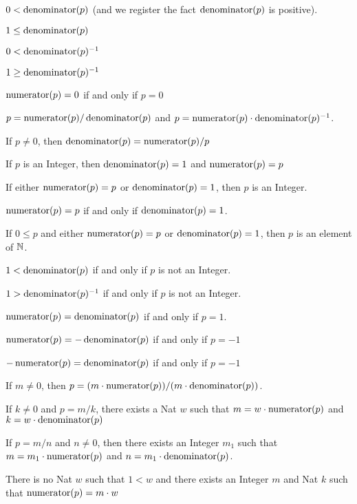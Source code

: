 \documentclass{article}
\begin{document}
\begin{thm}
\item\label{rat1:10} $0<\operatorname{denominator}(p)$ (and we register the fact
  $\operatorname{denominator}(p)$ is positive).
\item\label{rat1:11} $1\leq\operatorname{denominator}(p)$
\item\label{rat1:12} $0<\operatorname{denominator}(p)^{-1}$
\item\label{rat1:13} $1\geq\operatorname{denominator}(p)^{-1}$
\item\label{rat1:14} $\operatorname{numerator}(p)=0$ if and only if $p=0$
\item\label{rat1:15} $p=\operatorname{numerator}(p)/\operatorname{denominator}(p)$ and $p=\operatorname{numerator}(p)\cdot\operatorname{denominator}(p)^{-1}$.
\item\label{rat1:16} If $p\neq0$, then $\operatorname{denominator}(p)=\operatorname{numerator}(p)/p$
\item\label{rat1:17} If $p$ is an Integer, then $\operatorname{denominator}(p)=1$ and $\operatorname{numerator}(p)=p$
\item\label{rat1:18} If either $\operatorname{numerator}(p)=p$ or $\operatorname{denominator}(p)=1$,
  then $p$ is an Integer.
\item\label{rat1:19} $\operatorname{numerator}(p)=p$ if and only if $\operatorname{denominator}(p)=1$.
\item\label{rat1:20} If $0\leq p$ and either $\operatorname{numerator}(p)=p$ or
  $\operatorname{denominator}(p)=1$, then $p$ is an element of $\mathbb{N}$.
\item\label{rat1:21} $1<\operatorname{denominator}(p)$ if and only if $p$ is not an Integer.
\item\label{rat1:22} $1>\operatorname{denominator}(p)^{-1}$ if and only if $p$ is not
  an Integer.
\item\label{rat1:23} $\operatorname{numerator}(p)=\operatorname{denominator}(p)$ if and only if $p=1$.
\item\label{rat1:24} $\operatorname{numerator}(p)=-\operatorname{denominator}(p)$ if and only if $p=-1$
\item\label{rat1:25} $-\operatorname{numerator}(p)=\operatorname{denominator}(p)$ if and only if $p=-1$
\item\label{rat1:26} If $m\neq0$, then $p=(m\cdot\operatorname{numerator}(p))/(m\cdot\operatorname{denominator}(p))$.
\item\label{rat1:27} If $k\neq0$ and $p=m/k$, there exists a Nat $w$
  such that $m=w\cdot\operatorname{numerator}(p)$ and $k=w\cdot\operatorname{denominator}(p)$
\item\label{rat1:28} If $p=m/n$ and $n\neq0$, then there exists an
  Integer $m_{1}$ such that $m=m_{1}\cdot\operatorname{numerator}(p)$ and $n=m_{1}\cdot\operatorname{denominator}(p)$.
\item\label{rat1:29} There is no Nat $w$ such that $1<w$ and there
  exists an Integer $m$ and Nat $k$ such that $\operatorname{numerator}(p)=m\cdot w$

\end{thm}
\end{document}
